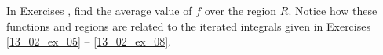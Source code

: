 {\noindent In Exercises}
{, find the average value of $f$ over the region $R$. Notice how these functions and regions are related to the iterated integrals given in Exercises \ref{13_02_ex_05} -- \ref{13_02_ex_08}.}
